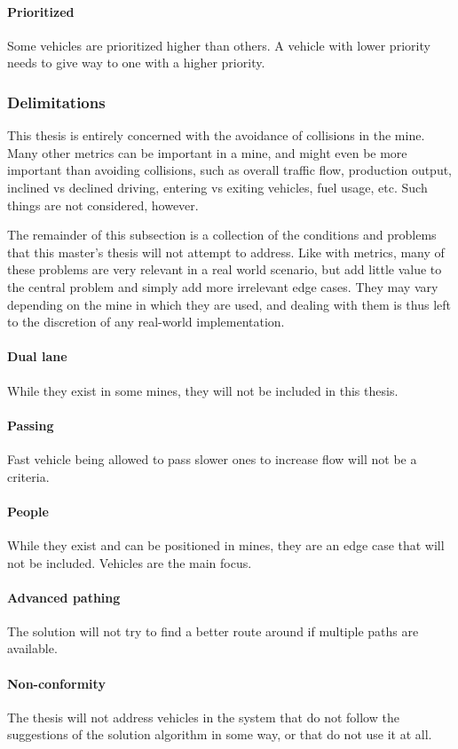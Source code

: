\documentclass{article}
\begin{document}
				\paragraph{Prioritized}
					Some vehicles are prioritized higher than others. A vehicle with lower priority needs to give way to one with a higher priority.

			\subsubsection{Delimitations}
				This thesis is entirely concerned with the avoidance of collisions in the mine. Many other metrics can be important in a mine, and might even be more important than avoiding collisions, such as overall traffic flow, production output, inclined vs declined driving, entering vs exiting vehicles, fuel usage, etc. Such things are not considered, however.

				The remainder of this subsection is a collection of the conditions and problems that this master's thesis will not attempt to address. Like with metrics, many of these problems are very relevant in a real world scenario, but add little value to the central problem and simply add more irrelevant edge cases. They may vary depending on the mine in which they are used, and dealing with them is thus left to the discretion of any real-world implementation.
				\paragraph{Dual lane}
					While they exist in some mines, they will not be included in this thesis.
				\paragraph{Passing}
					Fast vehicle being allowed to pass slower ones to increase flow will not be a criteria.
				\paragraph{People}
					While they exist and can be positioned in mines, they are an edge case that will not be included. Vehicles are the main focus.
				\paragraph{Advanced pathing}
					The solution will not try to find a better route around if multiple paths are available.
				\paragraph{Non-conformity}
					The thesis will not address vehicles in the system that do not follow the suggestions of the solution algorithm in some way, or that do not use it at all.
\end{document}
